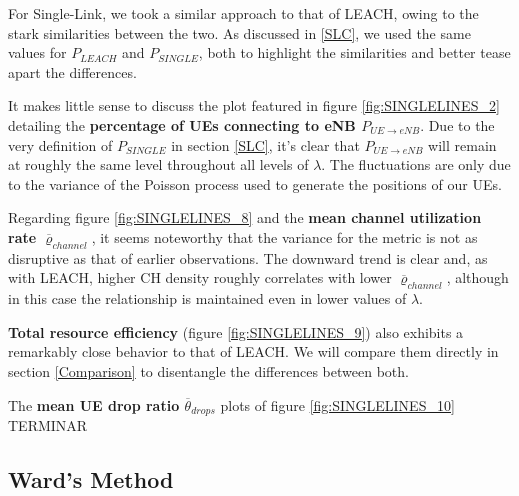 For Single-Link, we took a similar approach to that of LEACH, owing to the stark similarities between the two. As discussed in \ref{SLC}, we used the same values for $P_{LEACH}$ and $P_{SINGLE}$, both to highlight the similarities and better tease apart the differences.

It makes little sense to discuss the plot featured in figure \ref{fig:SINGLELINES_2} detailing the \textbf{percentage of UEs connecting to eNB $P_{UE\rightarrow eNB}$}. Due to the very definition of $P_{SINGLE}$ in section \ref{SLC}, it's clear that $P_{UE\rightarrow eNB}$ will remain at roughly the same level throughout all levels of $\lambda$. The fluctuations are only due to the variance of the Poisson process used to generate the positions of our UEs.

Regarding figure \ref{fig:SINGLELINES_8} and the \textbf{mean channel utilization rate $\overline{\varrho}_{channel}$}, it seems noteworthy that the variance for the metric is not as disruptive as that of earlier observations. The downward trend is clear and, as with LEACH, higher CH density roughly correlates with lower $\overline{\varrho}_{channel}$, although in this case the relationship is maintained even in lower values of $\lambda$.

\textbf{Total resource efficiency} (figure \ref{fig:SINGLELINES_9}) also exhibits a remarkably close behavior to that of LEACH. We will compare them directly in section \ref{Comparison} to disentangle the differences between both.

The \textbf{mean UE drop ratio $\overline{\theta}_{drops}$} plots of figure \ref{fig:SINGLELINES_10} TERMINAR

\subsection{Ward's Method} \label{description:WARD}

